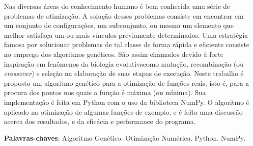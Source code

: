 Nas diversas áreas do conhecimento humano é bem conhecida uma série de problemas de otimização. 
A solução desses problemas consiste em encontrar em um conjunto de configurações, um subconjunto,
ou mesmo um elemento que melhor satisfaça um ou mais vínculos previamente determinados. Uma
estratégia famosa por solucionar problemas de tal classe de forma rápida e eficiente consiste no
emprego dos algoritmos genéticos. São assim chamados devido à forte inspiração em fenômenos
da biologia evolutiva\trav como mutação, recombinação (ou \textit{crossover}) e seleção\trav
na elaboração de suas etapas de execução. Neste trabalho é proposto um algoritmo genético para
a otimização de funções reais, isto é, para a procura dos pontos nos quais a função é máxima
(ou mínima). Sua implementação é feita em Python com o uso da biblioteca NumPy. 
O algoritmo é aplicado na otimização de algumas funções de exemplo, e é feita uma discussão acerca dos
resultados, e da eficácia e performance do programa. 

\vspace{\onelineskip}\noindent
\textbf{Palavras-chaves}: Algoritmo Genético. Otimização Numérica. Python. NumPy.